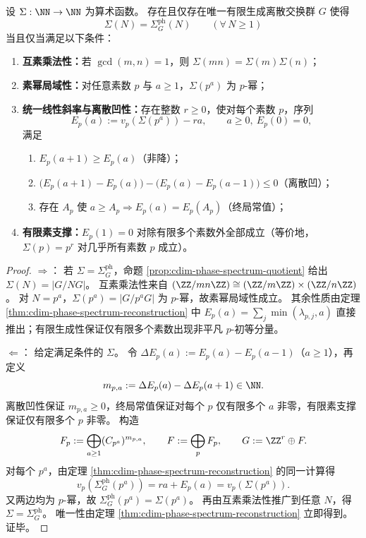 \begin{theorem}[相位谱像的内禀判别条件]\label{thm:cdim-phase-spectrum-characterization}
设 \(\Sigma:\NN\to\NN\) 为算术函数。
存在且仅存在唯一有限生成离散交换群 \(G\) 使得
\[
\Sigma(N)=\Sigma_G^{\mathrm{ph}}(N)\qquad(\forall\,N\ge 1)
\]
当且仅当满足以下条件：
\begin{enumerate}
  \item \textbf{互素乘法性：}若 \(\gcd(m,n)=1\)，则 \(\Sigma(mn)=\Sigma(m)\Sigma(n)\)；
  \item \textbf{素幂局域性：}对任意素数 \(p\) 与 \(a\ge 1\)，\(\Sigma(p^a)\) 为 \(p\)-幂；
  \item \textbf{统一线性斜率与离散凹性：}存在整数 \(r\ge 0\)，使对每个素数 \(p\)，序列
  \[
  E_p(a):=v_p(\Sigma(p^a))-ra,\qquad a\ge 0,\ E_p(0)=0,
  \]
  满足
  \begin{enumerate}
    \item \(E_p(a+1)\ge E_p(a)\)（非降）；
    \item \(\bigl(E_p(a+1)-E_p(a)\bigr)-\bigl(E_p(a)-E_p(a-1)\bigr)\le 0\)（离散凹）；
    \item 存在 \(A_p\) 使 \(a\ge A_p\Rightarrow E_p(a)=E_p(A_p)\)（终局常值）；
  \end{enumerate}
  \item \textbf{有限素支撑：}\(E_p(1)=0\) 对除有限多个素数外全部成立（等价地，\(\Sigma(p)=p^r\) 对几乎所有素数 \(p\) 成立）。
\end{enumerate}
\end{theorem}
\begin{proof}
\(\Rightarrow\)：
若 \(\Sigma=\Sigma_G^{\mathrm{ph}}\)，命题 \ref{prop:cdim-phase-spectrum-quotient} 给出
\(\Sigma(N)=|G/NG|\)。
互素乘法性来自 \((\ZZ/mn\ZZ)\cong(\ZZ/m\ZZ)\times(\ZZ/n\ZZ)\)。
对 \(N=p^a\)，\(\Sigma(p^a)=|G/p^aG|\) 为 \(p\)-幂，故素幂局域性成立。
其余性质由定理 \ref{thm:cdim-phase-spectrum-reconstruction} 中
\(
E_p(a)=\sum_j\min(\lambda_{p,j},a)
\)
直接推出；有限生成性保证仅有限多个素数出现非平凡 \(p\)-初等分量。

\(\Leftarrow\)：
给定满足条件的 \(\Sigma\)。
令 \(\Delta E_p(a):=E_p(a)-E_p(a-1)\)（\(a\ge 1\)），再定义
\[
m_{p,a}:=\Delta E_p(a)-\Delta E_p(a+1)\in\NN.
\]
离散凹性保证 \(m_{p,a}\ge 0\)，终局常值保证对每个 \(p\) 仅有限多个 \(a\) 非零，有限素支撑保证仅有限多个 \(p\) 非零。
构造
\[
F_p:=\bigoplus_{a\ge 1}(C_{p^a})^{m_{p,a}},\qquad
F:=\bigoplus_p F_p,\qquad
G:=\ZZ^r\oplus F.
\]
对每个 \(p^a\)，由定理 \ref{thm:cdim-phase-spectrum-reconstruction} 的同一计算得
\[
v_p(\Sigma_G^{\mathrm{ph}}(p^a))=ra+E_p(a)=v_p(\Sigma(p^a)).
\]
又两边均为 \(p\)-幂，故 \(\Sigma_G^{\mathrm{ph}}(p^a)=\Sigma(p^a)\)。
再由互素乘法性推广到任意 \(N\)，得 \(\Sigma=\Sigma_G^{\mathrm{ph}}\)。
唯一性由定理 \ref{thm:cdim-phase-spectrum-reconstruction} 立即得到。证毕。
\end{proof}

